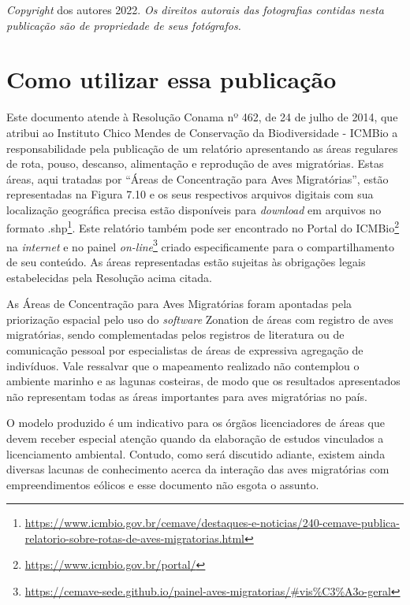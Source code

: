 \documentclass[
  oneside]{scrbook}
\DeclareRobustCommand{\href}[2]{#2\footnote{\url{#1}}}
\begin{document}
\emph{Copyright} dos autores 2022. \emph{Os direitos autorais das fotografias contidas nesta publicação são de propriedade de seus fotógrafos.}

\hypertarget{como-utilizar}{%
\chapter*{Como utilizar essa publicação}\label{como-utilizar}}

Este documento atende à Resolução Conama nº 462, de 24 de julho de 2014, que atribui ao Instituto Chico Mendes de Conservação da Biodiversidade - ICMBio a responsabilidade pela publicação de um relatório apresentando as áreas regulares de rota, pouso, descanso, alimentação e reprodução de aves migratórias. Estas áreas, aqui tratadas por ``Áreas de Concentração para Aves Migratórias'', estão representadas na Figura 7.10 e os seus respectivos arquivos digitais com sua localização geográfica precisa estão disponíveis para \emph{download} em \href{https://www.icmbio.gov.br/cemave/destaques-e-noticias/240-cemave-publica-relatorio-sobre-rotas-de-aves-migratorias.html}{arquivos no formato .shp}. Este relatório também pode ser encontrado no \href{https://www.icmbio.gov.br/portal/}{Portal do ICMBio} na \emph{internet} e no \href{https://cemave-sede.github.io/painel-aves-migratorias/\#vis\%C3\%A3o-geral}{painel \emph{on-line}} criado especificamente para o compartilhamento de seu conteúdo. As áreas representadas estão sujeitas às obrigações legais estabelecidas pela Resolução acima citada.

As Áreas de Concentração para Aves Migratórias foram apontadas pela priorização espacial pelo uso do \emph{software} Zonation de áreas com registro de aves migratórias, sendo complementadas pelos registros de literatura ou de comunicação pessoal por especialistas de áreas de expressiva agregação de indivíduos. Vale ressalvar que o mapeamento realizado não contemplou o ambiente marinho e as lagunas costeiras, de modo que os resultados apresentados não representam todas as áreas importantes para aves migratórias no país.

O modelo produzido é um indicativo para os órgãos licenciadores de áreas que devem receber especial atenção quando da elaboração de estudos vinculados a licenciamento ambiental. Contudo, como será discutido adiante, existem ainda diversas lacunas de conhecimento acerca da interação das aves migratórias com empreendimentos eólicos e esse documento não esgota o assunto.
\end{document}
